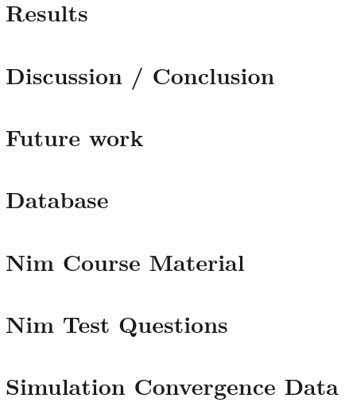 \documentclass[oneside]{memoir}
\begin{document}
\chapter{Results}
\label{ch:results}

\chapter{Discussion / Conclusion}
\label{ch:discussion_conclusion}

\chapter{Future work}
\label{ch:future_work}






\appendix
\chapter{Database}
\label{ax_database}

\chapter{Nim Course Material}
\label{ax_resources}

\chapter{Nim Test Questions}
\label{ax_questions}

\chapter{Simulation Convergence Data}
\label{ax_simulation_convergence_data}

\end{document}
